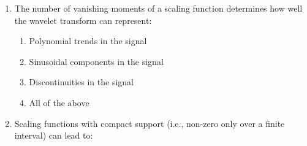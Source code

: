 \documentclass[
  letterpaper,
  DIV=11,
  numbers=noendperiod]{scrartcl}
\providecommand{\tightlist}{%
  \setlength{\itemsep}{0pt}\setlength{\parskip}{0pt}}\usepackage{longtable,booktabs,array}
\begin{document}
\begin{enumerate}
  \begin{itemize}
  \tightlist
  \item
    \begin{enumerate}
    \def\labelenumii{\alph{enumii})}
    \tightlist
    \item
      Stationary signals
    \end{enumerate}
  \item
    \begin{enumerate}
    \def\labelenumii{\alph{enumii})}
    \setcounter{enumii}{1}
    \tightlist
    \item
      Periodic signals
    \end{enumerate}
  \item
    \begin{enumerate}
    \def\labelenumii{\alph{enumii})}
    \setcounter{enumii}{2}
    \tightlist
    \item
      Non-stationary signals with abrupt changes
    \end{enumerate}
  \item
    \begin{enumerate}
    \def\labelenumii{\alph{enumii})}
    \setcounter{enumii}{3}
    \tightlist
    \item
      Signals with smooth, gradual changes
    \end{enumerate}
  \end{itemize}
\item
  The number of vanishing moments of a scaling function determines how
  well the wavelet transform can represent:

  \begin{enumerate}
  \def\labelenumii{\alph{enumii})}
  \tightlist
  \item
    Polynomial trends in the signal
  \item
    Sinusoidal components in the signal
  \item
    Discontinuities in the signal
  \item
    All of the above
  \end{enumerate}
\item
  Scaling functions with compact support (i.e., non-zero only over a
  finite interval) can lead to:


\end{enumerate}
\end{document}

